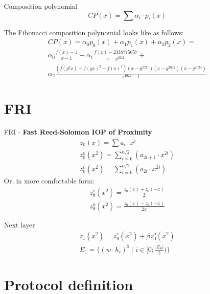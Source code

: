 \documentclass{zkdl-presentation-template}
\begin{document}
\begin{frame}{Composition polynomial}
    \begin{equation*}
        CP(x) = \sum \alpha_i\cdot p_i(x)
    \end{equation*}

    \begin{example}
        The Fibonacci composition polynomial looks like as follows:
        \begin{gather*}
            CP(x) = \alpha_0 p_0(x) + \alpha_1 p_1(x) + \alpha_2 p_2(x) =\\
            \alpha_0 \frac{f(x)-1}{x - 1} + \alpha_1 \frac{f(x) - 2338775057}{x - g^{1022}} + \\
            \alpha_2 \frac{(f(g^2x) - f(gx)^2 - f(x)^2)(x - g^{2021})(x - g^{2022})(x - g^{2024})}{x^{1024} - 1}
        \end{gather*}
    \end{example}
\end{frame}

\section{FRI}

\begin{frame}
    FRI - \textbf{Fast Reed-Solomon IOP of Proximity}
    \begin{gather*}
        z_0(x) = \sum a_i\cdot x^i\\
        z_0^o(x^2) = \sum_{i=0}^{n/2} (a_{2i+1}\cdot x^{2i})\\
        z_0^e(x^2) = \sum_{i=0}^{n/2} (a_{2i}\cdot x^{2i})
    \end{gather*}
    Or, in more comfortable form:
    \begin{gather*}
        z_0^e(x^2) = \frac{z_0(x) + z_0(-x)}{2}\\
        z_0^o(x^2) = \frac{z_0(x) - z_0(-x)}{2x}
    \end{gather*}
\end{frame}

\begin{frame}{Next layer}
    \begin{gather*}
        z_1(x^2) = z_0^e(x^2) + \beta z_0^o(x^2)\\
        E_1 = \{(w\cdot h_i)^2 \;|\; i \in [0;\frac{|E_0|}{2})\}
    \end{gather*}
\end{frame}

\section{Protocol definition}
\end{document}
